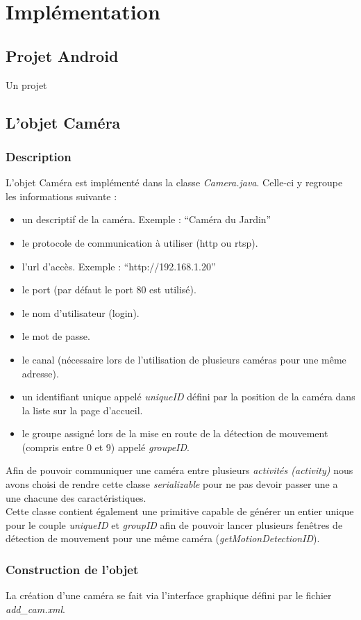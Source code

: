 \chapter{Implémentation}
\section{Projet Android}
Un projet 
\section{L'objet Caméra}
\subsection{Description}
L'objet Caméra est implémenté dans la classe \textit{Camera.java}.\newline
Celle-ci y regroupe les informations suivante : 
\begin{itemize} 
\item un descriptif de la caméra. Exemple : ``Caméra du Jardin''
\item le protocole de communication à utiliser (http ou rtsp).
\item l'url d'accès. Exemple : ``http://192.168.1.20''
\item le port (par défaut le port 80 est utilisé).
\item le nom d'utilisateur (login).
\item le mot de passe.
\item le canal (nécessaire lors de l'utilisation de plusieurs caméras pour une
même adresse).
\item un identifiant unique appelé \textit{uniqueID} défini par la position de
la caméra dans la liste sur la page d'accueil.
\item le groupe assigné lors de la mise en route de la détection de mouvement
(compris entre 0 et 9) appelé \textit{groupeID}.\\
\end{itemize}
\indent Afin de pouvoir communiquer une caméra entre plusieurs \textit{activités
(activity)} nous avons choisi de rendre cette classe \textit{serializable} pour
ne pas devoir passer une a une chacune des caractéristiques.\\
Cette classe contient également une primitive capable de générer un entier
unique pour le couple \textit{uniqueID} et \textit{groupID} afin de pouvoir
lancer plusieurs fenêtres de détection de mouvement pour une même caméra
(\textit{getMotionDetectionID}).
\subsection{Construction de l'objet}
La création d'une caméra se fait via l'interface graphique défini par le
fichier \textit{add\_cam.xml}.\newline

